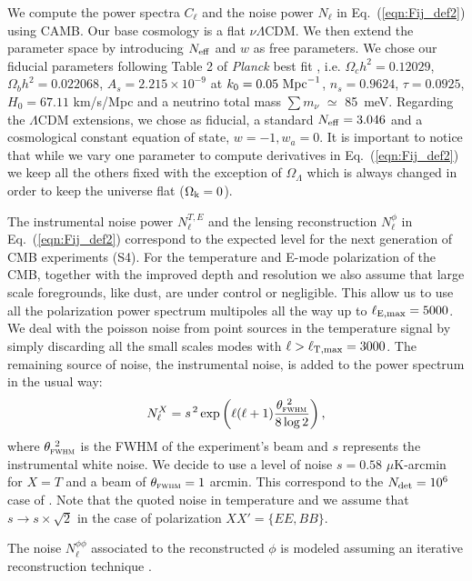 \documentclass[aps,prd,reprint,superscriptaddress]{revtex4-1}
\newcommand\refeq[1]{Eq.~(\ref{eqn:#1})}
\begin{document}
We compute the power spectra $C_{\ell}$ and the noise power $N_{\ell}$ in \refeq{Fij_def2} using CAMB.
Our base cosmology is a flat $\nu \Lambda$CDM. 
We then extend the parameter space by introducing $N_{\rm eff}$ and $w$ as free parameters.
We chose our fiducial parameters following Table 2 of \textit{Planck} best fit \cite{planck-collaboration:2014g}, i.e. $\Omega_c h^2 = 0.12029$, $\Omega_b h^2 = 0.022068$, $A_s = 2.215\times10^{-9}$ at $k_0 = 0.05\ {\rm Mpc}^{-1}$, $n_s = 0.9624$, $\tau = 0.0925$, $H_0 = 67.11$ km/s/Mpc and a neutrino total mass $\sum m_\nu$ $\simeq$ 85\ meV.  
Regarding the $\Lambda$CDM extensions, we chose as fiducial, a standard $N_{\rm eff}=3.046$ and a cosmological constant equation of state, $w=-1,w_{a}=0$.
It is important to notice that while we vary one parameter to compute derivatives in \refeq{Fij_def2} we keep all the others fixed with the exception of $\Omega_{\Lambda}$ which is always changed in order to keep the universe flat ($\Omega_{\rm k} = 0$).

The instrumental noise power $N_{\ell}^{T,E}$ and the lensing reconstruction $N_{\ell}^{\phi}$ in \refeq{Fij_def2} correspond to the expected level for the next generation of CMB experiments (S4).
For the temperature and E-mode polarization of the CMB, together with the improved depth and resolution we also assume that large scale foregrounds, like dust, are under control or negligible. This allow us to use all the polarization power spectrum multipoles all the way up to $\ell_{\rm E,max}=5000$. We deal with the poisson noise from point sources in the temperature signal by simply discarding all the small scales modes with $\ell>\ell_{\rm T,max}=3000$.
The remaining source of noise, the instrumental noise, is added to the power spectrum in the usual way:
 \begin{equation}
 	\centering
		N^{X}_\ell = s^{\, 2} \exp \left(\ell(\ell+1) \frac{\theta^{\ 2}_{\textsc{fwhm}}}{8\log2}\right),
	\label{eq:beamnoise}
\end{equation}
where $\theta^{\ 2}_{\textsc{fwhm}}$ is the FWHM of the experiment's beam and $s$ represents the instrumental white noise.
We decide to use a level of noise $s = 0.58$ $\mu$K-arcmin for $X=T$ and a beam of $\theta_{\textsc{fwhm}}=1$ arcmin. This correspond to the $N_{\rm det}=10^{6}$ case of \cite{wu:2014}. 
Note that the quoted noise in temperature and we assume that $s \rightarrow s\times \sqrt{2}$ in the case of polarization $ XX' = \{ EE, BB \}$.


The noise $N_\ell^{\phi\phi}$ associated to the reconstructed $\phi$ is modeled assuming an iterative reconstruction technique \cite{seljak:2004}. 
\end{document}
